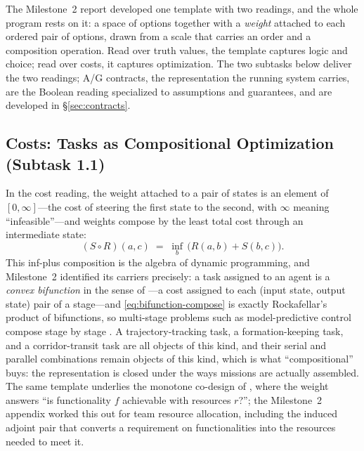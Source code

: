 \documentclass[11pt]{article}
\newif\ifshowcomments
\theoremstyle{definition}
\theoremstyle{remark}
\newcommand{\prompt}[1]{%
    \ifshowcomments
        ~\todo[inline, color=techgold!80, textcolor=black,caption={Task}]{{\bf Prompt:} #1}%
    \fi
}
\begin{document}
The Milestone~2 report developed one template with two readings, and the whole program rests on
it: a space of options together with a \emph{weight} attached to each ordered pair of options,
drawn from a scale that carries an order and a composition operation.
Read over truth values, the template captures logic and choice; read over costs, it captures
optimization.
The two subtasks below deliver the two readings; A/G contracts, the representation the running
system carries, are the Boolean reading specialized to assumptions and guarantees, and are
developed in \S\ref{sec:contracts}.

\subsection{Costs: Tasks as Compositional Optimization (Subtask 1.1)}
\label{sec:subtask11}

\prompt{Convex programs are translated into an $\overline{\mathbb{R}}$-enriched category using
convex bifunctions, allowing tasks like trajectory tracking to be composed in series or
parallel. Deliverable: Mathematical definitions and examples, contributing to Milestone 2's
technical report.}

In the cost reading, the weight attached to a pair of states is an element of
$[0, \infty]$---the cost of steering the first state to the second, with $\infty$ meaning
``infeasible''---and weights compose by the least total cost through an intermediate state:
\begin{equation}
\label{eq:bifunction-compose}
(S \circ R)(a, c) \;=\; \inf_{b}\,\bigl(R(a, b) + S(b, c)\bigr).
\end{equation}
This inf-plus composition is the algebra of dynamic programming, and Milestone~2 identified
its carriers precisely: a task assigned to an agent is a \emph{convex bifunction} in the sense
of \citet{rockafellarConvexAnalysis1970}---a cost assigned to each (input state, output state)
pair of a stage---and \eqref{eq:bifunction-compose} is exactly Rockafellar's product of
bifunctions, so multi-stage problems such as model-predictive control compose stage by stage
\citep{hanksModelingModelPredictive2024}.
A trajectory-tracking task, a formation-keeping task, and a corridor-transit task are all
objects of this kind, and their serial and parallel combinations remain objects of this kind,
which is what ``compositional'' buys: the representation is closed under the ways missions are
actually assembled.
The same template underlies the monotone co-design of \citet{zardini2023}, where the weight
answers ``is functionality $f$ achievable with resources $r$?''; the Milestone~2 appendix
worked this out for team resource allocation, including the induced adjoint pair that converts
a requirement on functionalities into the resources needed to meet it.
\end{document}
